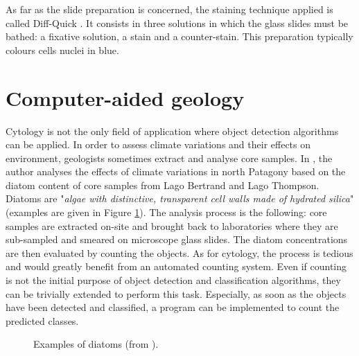 As far as the slide preparation is concerned, the staining technique applied is called Diff-Quick \cite{diffquick2016}. It consists in three solutions in which the glass slides must be bathed: a fixative solution, a stain and a counter-stain. This preparation typically colours cells nuclei in blue. 

\section{Computer-aided geology}
Cytology is not the only field of application where object detection algorithms can be applied. In order to assess climate variations and their effects on environment, geologists sometimes extract and analyse core samples. In  \cite{vsacre2011}, the author analyses the effects of climate variations in north Patagony based on the diatom content of core samples from Lago Bertrand and Lago Thompson. Diatoms are "\textit{algae with distinctive, transparent cell walls made of hydrated silica}" \cite{diatoms2016} (examples are given in Figure \ref{fig:diatoms}). The analysis process is the following: core samples are extracted on-site and brought back to laboratories where they are sub-sampled and smeared on microscope glass slides. The diatom concentrations are then evaluated by counting the objects. As for cytology, the process is tedious and would greatly benefit from an automated counting system. Even if counting is not the initial purpose of object detection and classification algorithms, they can be trivially extended to perform this task. Especially, as soon as the objects have been detected and classified, a program can be implemented to count the predicted classes.

\begin{figure}
	\center
	\caption{Examples of diatoms (from \cite{vsacre2011}).}
	\label{fig:diatoms}
\end{figure}